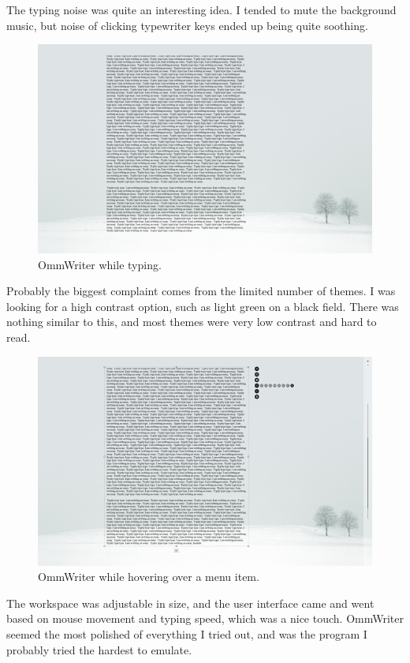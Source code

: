 \documentclass[10pt]{article}
\begin{document}
The typing noise was quite an interesting idea. I tended to mute the background music, but noise of clicking typewriter keys ended up being quite soothing.

\begin{figure}
   \centering
      \includegraphics[width=130mm]{images/ommwriter2.png}
   \caption{OmmWriter while typing.}
\end{figure}

Probably the biggest complaint comes from the limited number of themes. I was looking for a high contrast option, such as light green on a black field. There was nothing similar to this, and most themes were very low contrast and hard to read.

\begin{figure}
   \centering
      \includegraphics[width=130mm]{images/ommwriter3.png}
   \caption{OmmWriter while hovering over a menu item.}
\end{figure}

The workspace was adjustable in size, and the user interface came and went based on mouse movement and typing speed, which was a nice touch. OmmWriter seemed the most polished of everything I tried out, and was the program I probably tried the hardest to emulate.
\end{document}
